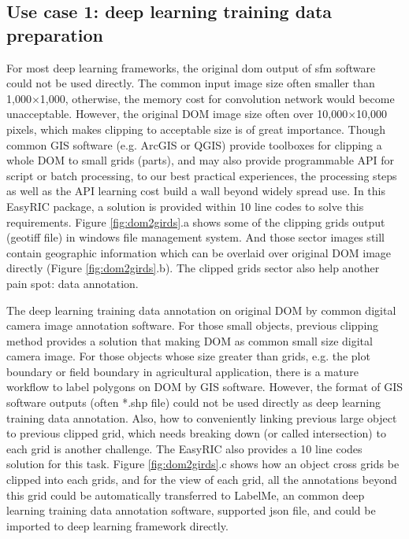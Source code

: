 \documentclass{configs/bmcart}
\begin{document}
\subsection*{Use case 1: deep learning training data preparation}
For most deep learning frameworks, the original \acrfull*{dom} output of \acrfull*{sfm} software could not be used directly. The common input image size often smaller than 1,000$\times$1,000, otherwise, the memory cost for convolution network would become unacceptable. However, the original DOM image size often over 10,000$\times$10,000 pixels, which makes clipping to acceptable size is of great importance. Though common GIS software (e.g. ArcGIS or QGIS) provide toolboxes for clipping a whole DOM to small grids (parts), and may also provide programmable API for script or batch processing, to our best practical experiences, the processing steps as well as the API learning cost build a wall beyond widely spread use. In this EasyRIC package, a solution is provided within 10 line codes to solve this requirements. Figure \ref{fig:dom2girds}.a shows some of the clipping grids output (geotiff file) in windows file management system. And those sector images still contain geographic information which can be overlaid over original DOM image directly (Figure \ref{fig:dom2girds}.b). The clipped grids sector also help another pain spot: data annotation.

The deep learning training data annotation on original DOM by common digital camera image annotation software. For those small objects, previous clipping method provides a solution that making DOM as common small size digital camera image. For those objects whose size greater than grids, e.g. the plot boundary or field boundary in agricultural application, there is a mature workflow to label polygons on DOM by GIS software. However, the format of GIS software outputs (often *.shp file) could not be used directly as deep learning training data annotation. Also, how to conveniently linking previous large object to previous clipped grid, which needs breaking down (or called intersection) to each grid is another challenge. The EasyRIC also provides a 10 line codes solution for this task. Figure \ref{fig:dom2girds}.c shows how an object cross grids be clipped into each grids, and for the view of each grid, all the annotations beyond this grid could be automatically transferred to LabelMe, an common deep learning training data annotation software, supported json file, and could be imported to deep learning framework directly.
\end{document}

